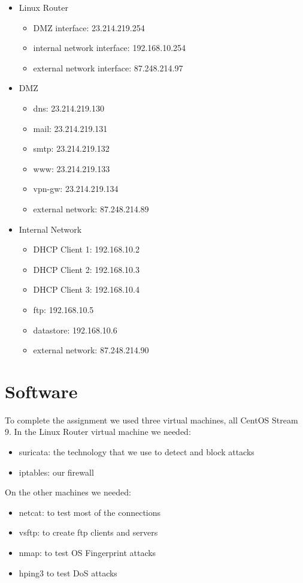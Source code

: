 \documentclass{article}
\begin{document}
\begin{itemize}
\item Linux Router
\begin{itemize}
\item DMZ interface: 23.214.219.254
\item internal network interface: 192.168.10.254
\item external network interface: 87.248.214.97
\end{itemize}
\item DMZ
\begin{itemize}
\item dns: 23.214.219.130
\item mail: 23.214.219.131
\item smtp: 23.214.219.132
\item www: 23.214.219.133
\item vpn-gw: 23.214.219.134
\item external network: 87.248.214.89
\end{itemize}
\item Internal Network
\begin{itemize}
\item DHCP Client 1: 192.168.10.2
\item DHCP Client 2: 192.168.10.3
\item DHCP Client 3: 192.168.10.4
\item ftp: 192.168.10.5
\item datastore: 192.168.10.6
\item external network: 87.248.214.90
\end{itemize}

\end{itemize}


\section{Software}
\texttt{}\par To complete the assignment we used three virtual machines, all CentOS Stream 9. In the Linux Router virtual machine we needed:

\begin{itemize}
    \item suricata: the technology that we use to detect and block attacks
    \item iptables: our firewall\par
\end{itemize}
On the other machines we needed:  
\begin{itemize}
    \item netcat: to test most of the connections
    \item vsftp: to create ftp clients and servers
    \item nmap: to test OS Fingerprint attacks
    \item hping3 to test DoS attacks
\end{itemize}
\end{document}
